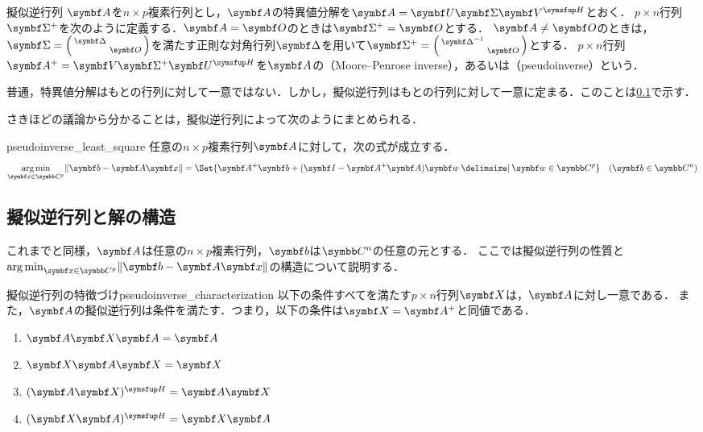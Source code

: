 \documentclass[../../main]{subfiles}
\begin{document}
\begin{definition}{擬似逆行列}{}
  \(\mat{A}\)を\(n\times p\)複素行列とし，\(\mat{A}\)の特異値分解を\(\mat{A}=\mat{U}\mat{\Sigma}\htrps{\mat{V}}\)とおく．
  \(p\times n\)行列\(\pinv{\mat{\Sigma}}\)を次のように定義する．\(\mat{A}=\zmat\)のときは\(\pinv{\mat{\Sigma}}=\zmat\)とする．
  \(\mat{A}\neq\zmat\)のときは，\(\mat{\Sigma}=\smallmatrice{\mat{\Delta} & \\ & \zmat}\)を満たす正則な対角行列\(\mat{\Delta}\)を用いて\(\pinv{\mat{\Sigma}}=\smallmatrice{\mat{\Delta}^{-1} & \\ & \zmat}\)とする．
  \(p\times n\)行列\(\pinv{\mat{A}}=\mat{V}\pinv{\mat{\Sigma}}\htrps{\mat{U}}\)を\(\mat{A}\)の（Moore–Penrose inverse），あるいは（pseudoinverse）という．
\end{definition}

\begin{note}
  普通，特異値分解はもとの行列に対して一意ではない．しかし，擬似逆行列はもとの行列に対して一意に定まる．このことは\cref{subsection:pseudoinverse}で示す．
\end{note}

さきほどの議論から分かることは，擬似逆行列によって次のようにまとめられる．

\begin{proposition}{}{pseudoinverse_least_square}
  任意の\(n\times p\)複素行列\(\mat{A}\)に対して，次の式が成立する．
  \[
    \argmin_{\vect{x}\in\numset{C}^p}\vnorm{\vect{b}-\mat{A}\vect{x}} = \Set{\pinv{\mat{A}}\vect{b}+(\imat-\pinv{\mat{A}}\mat{A})\vect{w}\given\vect{w}\in\numset{C}^p}\quad(\vect{b}\in\numset{C}^n)
  \]
\end{proposition}

\subsection{擬似逆行列と解の構造}
\label{subsection:pseudoinverse}

これまでと同様，\(\mat{A}\)は任意の\(n\times p\)複素行列，\(\vect{b}\)は\(\numset{C}^n\)の任意の元とする．
ここでは擬似逆行列の性質と\(\argmin_{\vect{x}\in\numset{C}^p}\vnorm{\vect{b}-\mat{A}\vect{x}}\)の構造について説明する．

\begin{proposition}{擬似逆行列の特徴づけ}{pseudoinverse_characterization}
  以下の条件すべてを満たす\(p\times n\)行列\(\mat{X}\)は，\(\mat{A}\)に対し一意である．
  また，\(\mat{A}\)の擬似逆行列は条件を満たす．つまり，以下の条件は\(\mat{X}=\pinv{\mat{A}}\)と同値である．
  \begin{enumerate}
    \item \(\mat{A}\mat{X}\mat{A}=\mat{A}\)
    \item \(\mat{X}\mat{A}\mat{X}=\mat{X}\)
    \item \(\htrps{(\mat{A}\mat{X})}=\mat{A}\mat{X}\)
    \item \(\htrps{(\mat{X}\mat{A})}=\mat{X}\mat{A}\)
  \end{enumerate}
\end{proposition}
\end{document}
